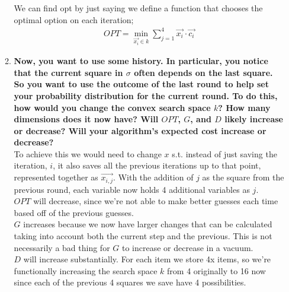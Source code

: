 \documentclass{article}
\begin{document}
\begin{enumerate}
\begin{enumerate}
We can find opt by just saying we define a function that chooses the optimal option on each iteration; 
\begin{align*}
    OPT = \min_{\overrightarrow{x_i} \in k} \sum_{j=1}^4 \overrightarrow{x_i} \cdot \overrightarrow{c_i}
\end{align*}







\item \textbf{Now, you want to use some history. In particular, you notice that the current square in $\sigma$ often depends on the last square. So you want to use the outcome of the last round to help set your probability distribution for the current round. To do this, how would you change the convex search space $k$? How many dimensions does it now have? Will $OPT$, $G$, and $D$ likely increase or decrease? Will your algorithm's expected cost increase or decrease? } \\

To achieve this we would need to change $x$ s.t. instead of just saving the iteration, $i$, it also saves all the previous iterations up to that point, represented together as $\overrightarrow{x_{i,j}}$. With the addition of $j$ as the square from the previous round, each variable now holds 4 additional variables as $j$. \\

$OPT$ will decrease, since we're not able to make better guesses each time based off of the previous guesses. \\

$G$ increases because we now have larger changes that can be calculated taking into account both the current step and the previous. This is not necessarily a bad thing for $G$ to increase or decrease in a vacuum. \\

$D$ will increase substantially. For each item we store 4x items, so we're functionally increasing the search space $k$ from 4 originally to 16 now since each of the previous 4 squares we save have 4 possibilities. 



\end{enumerate}



\end{enumerate}
\end{document}
